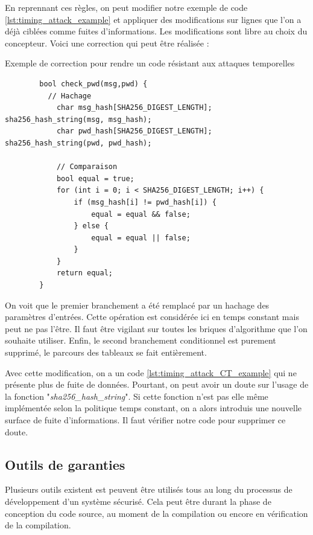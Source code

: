 En reprennant ces règles, on peut modifier notre exemple de code \ref{lst:timing_attack_example} et appliquer des modifications sur lignes que l'on a déjà ciblées comme fuites d'informations. Les modifications sont libre au choix du concepteur. Voici une correction qui peut être réalisée :

\begin{listing}[!htb]
    \caption{Exemple de correction pour rendre un code résistant aux attaques temporelles}
    \label{lst:timing_attack_CT_example}
    \begin{verbatim}
        bool check_pwd(msg,pwd) {
          // Hachage
            char msg_hash[SHA256_DIGEST_LENGTH]; sha256_hash_string(msg, msg_hash);
            char pwd_hash[SHA256_DIGEST_LENGTH]; sha256_hash_string(pwd, pwd_hash);

            // Comparaison
            bool equal = true;
            for (int i = 0; i < SHA256_DIGEST_LENGTH; i++) {
                if (msg_hash[i] != pwd_hash[i]) {
                    equal = equal && false;
                } else {
                    equal = equal || false;
                }
            }
            return equal;
        }
    \end{verbatim}
\end{listing}

On voit que le premier branchement a été remplacé par un hachage des paramètres d'entrées. Cette opération est considérée ici en temps constant mais peut ne pas l'être. Il faut être vigilant sur toutes les briques d'algorithme que l'on souhaite utiliser. Enfin, le second branchement conditionnel est purement supprimé, le parcours des tableaux se fait entièrement.\bigbreak

Avec cette modification, on a un code \ref{lst:timing_attack_CT_example} qui ne présente plus de fuite de données. Pourtant, on peut avoir un doute sur l'usage de la fonction "\textit{sha256\_hash\_string}". Si cette fonction n'est pas elle même implémentée selon la politique temps constant, on a alors introduis une nouvelle surface de fuite d'informations. Il faut vérifier notre code pour supprimer ce doute.\medbreak

\subsection*{Outils de garanties}

Plusieurs outils existent est peuvent être utilisés tous au long du processus de développement d'un système sécurisé. Cela peut être durant la phase de conception du code source, au moment de la compilation ou encore en vérification de la compilation.\smallbreak


